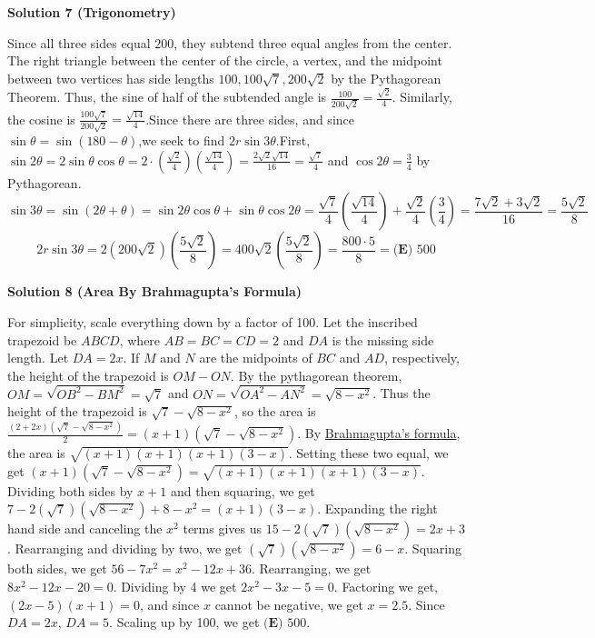 \begin{enumerate}
\textbf{Solution 7 (Trigonometry)}

Since all three sides equal $200$, they subtend three equal angles from the center. The right triangle between the center of the circle, a vertex, and the midpoint between two vertices has side lengths $100,100\sqrt{7},200\sqrt{2}$ by the Pythagorean Theorem. Thus, the sine of half of the subtended angle is $\frac{100}{200\sqrt{2}}=\frac{\sqrt{2}}{4}$. Similarly, the cosine is $\frac{100\sqrt{7}}{200\sqrt{2}}=\frac{\sqrt{14}}{4}$.Since there are three sides, and since $\sin\theta=\sin\left(180-\theta\right)$,we seek to find $2r\sin 3\theta$.First, $\sin 2\theta=2\sin\theta\cos\theta=2\cdot\left(\frac{\sqrt{2}}{4}\right)\left(\frac{\sqrt{14}}{4}\right)=\frac{2\sqrt{2}\sqrt{14}}{16}=\frac{\sqrt{7}}{4}$ and $\cos 2\theta=\frac{3}{4}$ by Pythagorean.
 \[\sin 3\theta=\sin(2\theta+\theta)=\sin 2\theta\cos\theta+\sin \theta\cos 2\theta=\frac{\sqrt{7}}{4}\left(\frac{\sqrt{14}}{4}\right)+\frac{\sqrt{2}}{4}\left(\frac{3}{4}\right)=\frac{7\sqrt{2}+3\sqrt{2}}{16}=\frac{5\sqrt{2}}{8}\]
 \[2r\sin 3\theta=2\left(200\sqrt{2}\right)\left(\frac{5\sqrt{2}}{8}\right)=400\sqrt{2}\left(\frac{5\sqrt{2}}{8}\right)=\frac{800\cdot 5}{8}=\boxed{\textbf{(E)}\text{ 500}}\]




\textbf{Solution 8 (Area By Brahmagupta's Formula)}

For simplicity, scale everything down by a factor of 100. Let the inscribed trapezoid be $ABCD$, where $AB=BC=CD=2$ and $DA$ is the missing side length. Let $DA=2x$. If $M$ and $N$ are the midpoints of $BC$ and $AD$, respectively, the height of the trapezoid is $OM-ON$. By the pythagorean theorem, $OM=\sqrt{OB^2-BM^2}=\sqrt7$ and $ON=\sqrt{OA^2-AN^2}=\sqrt{8-x^2}$. Thus the height of the trapezoid is $\sqrt7-\sqrt{8-x^2}$, so the area is $\frac{(2+2x)(\sqrt7-\sqrt{8-x^2})}{2}=(x+1)(\sqrt7-\sqrt{8-x^2})$. By \href{https://artofproblemsolving.com/wiki/index.php?title=Brahmagupta\%27s\_formula}{Brahmagupta's formula}, the area is $\sqrt{(x+1)(x+1)(x+1)(3-x)}$. Setting these two equal, we get $(x+1)(\sqrt7-\sqrt{8-x^2})=\sqrt{(x+1)(x+1)(x+1)(3-x)}$. Dividing both sides by $x+1$ and then squaring, we get $7-2(\sqrt7)(\sqrt{8-x^2})+8-x^2=(x+1)(3-x)$. Expanding the right hand side and canceling the $x^2$ terms gives us $15-2(\sqrt7)(\sqrt{8-x^2})=2x+3$. Rearranging and dividing by two, we get $(\sqrt7)(\sqrt{8-x^2})=6-x$. Squaring both sides, we get $56-7x^2=x^2-12x+36$. Rearranging, we get $8x^2-12x-20=0$. Dividing by 4 we get $2x^2-3x-5=0$. Factoring we get, $(2x-5)(x+1)=0$, and since $x$ cannot be negative, we get $x=2.5$. Since $DA=2x$, $DA=5$. Scaling up by 100, we get $\boxed{\textbf{(E)}\text{ 500}}$.


\end{enumerate}
